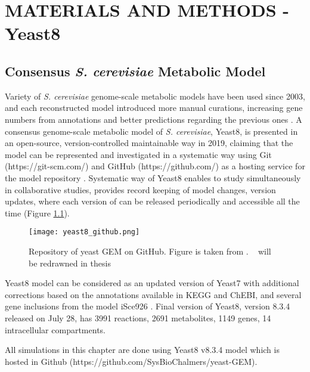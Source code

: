 \chapter{MATERIALS AND METHODS - Yeast8}

\section{Consensus \emph{S. cerevisiae} Metabolic Model}
Variety of \emph{S. cerevisiae} genome-scale metabolic models have been used since 2003, and each reconstructed model introduced more manual curations, increasing gene numbers from annotations and better predictions regarding the previous ones \cite{lopes2017genome}. A consensus genome-scale metabolic model of \emph{S. cerevisiae}, Yeast8, is presented in an open-source, version-controlled maintainable way in 2019, claiming that the model can be represented and investigated in a systematic way using Git (https://git-scm.com/) and GitHub (https://github.com/) as a hosting service for the model repository \cite{lu2019consensus}. Systematic way of Yeast8 enables to study simultaneously in collaborative studies, provides record keeping of model changes, version updates, where each version of can be released periodically and accessible all the time (Figure \ref{fig:yeast8_github}).
\begin{figure}[ht]
\begin{center}
\texttt{[image: yeast8\_github.png]}
\end{center}
\caption[Repository of yeast GEM on GitHub]{Repository of yeast GEM on GitHub. Figure is taken from \cite{lu2019consensus}. ~ will be redrawned in thesis}
\label{fig:yeast8_github}
\end{figure}

Yeast8 model can be considered as an updated version of Yeast7 \cite{aung2013revising} with additional corrections based on the annotations available in KEGG and ChEBI, and several gene inclusions from the model iSce926 \cite{chowdhury2015using}. Final version of Yeast8, version 8.3.4 released on July 28, has 3991 reactions, 2691 metabolites, 1149 genes, 14 intracellular compartments.

All simulations in this chapter are done using Yeast8 v8.3.4 model which is hosted in Github (https://github.com/SysBioChalmers/yeast-GEM).

